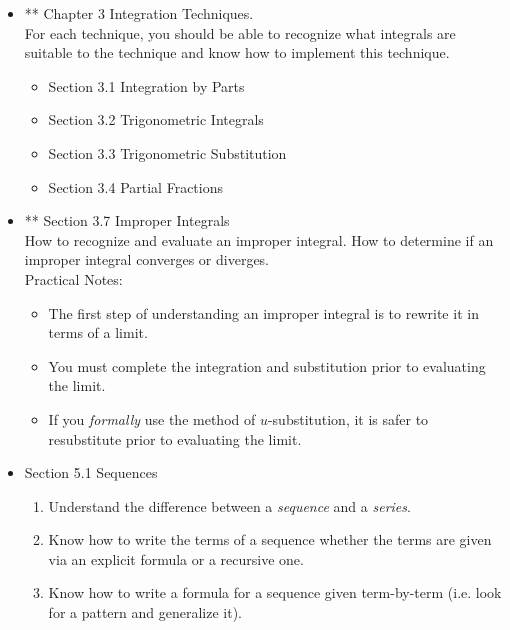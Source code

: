 \documentclass[11pt,fleqn]{article}
\begin{document}
\begin{itemize}
\newpage

\item ** Chapter 3 Integration Techniques.\\
For each technique, you should be able to recognize what integrals are suitable to the technique and know how to implement this technique.
	\begin{itemize}
	\item Section 3.1 Integration by Parts
	\item Section 3.2 Trigonometric Integrals
	\item Section 3.3 Trigonometric Substitution
	\item Section 3.4 Partial Fractions
	\end{itemize}


\item ** Section 3.7 Improper Integrals\\

How to recognize and evaluate an improper integral. How to determine if an improper integral converges or diverges.\\

Practical Notes:
	\begin{itemize}
	\item The first step of understanding an improper integral is to rewrite it in terms of a limit.
	\item You must complete the integration and substitution prior to evaluating the limit.
	\item If you \emph{formally} use the method of $u$-substitution, it is safer to resubstitute prior to evaluating the limit.\\
	\end{itemize}

\item Section 5.1 Sequences\\

	\begin{enumerate}
	\item Understand the difference between a \emph{sequence} and a \emph{series}. 
	\item Know how to write the terms of a sequence whether the terms are given via an explicit formula or a recursive one. 
	\item Know how to write a formula for a sequence given term-by-term (i.e. look for a pattern and  generalize it).\\
	\end{enumerate}
	

\end{itemize}
\end{document}
